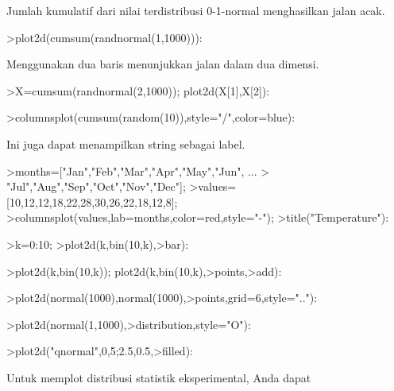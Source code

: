 \documentclass[a4paper,10pt]{article}
\begin{document}
\begin{eulernotebook}
\begin{eulercomment}
\begin{eulercomment}
\begin{eulercomment}
\begin{eulercomment}
\begin{eulercomment}
Jumlah kumulatif dari nilai terdistribusi 0-1-normal menghasilkan
jalan acak.
\end{eulercomment}
\begin{eulerprompt}
>plot2d(cumsum(randnormal(1,1000))):
\end{eulerprompt}
\begin{eulercomment}
Menggunakan dua baris menunjukkan jalan dalam dua dimensi.
\end{eulercomment}
\begin{eulerprompt}
>X=cumsum(randnormal(2,1000)); plot2d(X[1],X[2]):
\end{eulerprompt}
\begin{eulerprompt}
>columnsplot(cumsum(random(10)),style="/",color=blue):
\end{eulerprompt}
\begin{eulercomment}
Ini juga dapat menampilkan string sebagai label.
\end{eulercomment}
\begin{eulerprompt}
>months=["Jan","Feb","Mar","Apr","May","Jun", ...
>  "Jul","Aug","Sep","Oct","Nov","Dec"];
>values=[10,12,12,18,22,28,30,26,22,18,12,8];
>columnsplot(values,lab=months,color=red,style="-");
>title("Temperature"):
\end{eulerprompt}
\begin{eulerprompt}
>k=0:10;
>plot2d(k,bin(10,k),>bar):
\end{eulerprompt}
\begin{eulerprompt}
>plot2d(k,bin(10,k)); plot2d(k,bin(10,k),>points,>add):
\end{eulerprompt}
\begin{eulerprompt}
>plot2d(normal(1000),normal(1000),>points,grid=6,style=".."):
\end{eulerprompt}
\begin{eulerprompt}
>plot2d(normal(1,1000),>distribution,style="O"):
\end{eulerprompt}
\begin{eulerprompt}
>plot2d("qnormal",0,5;2.5,0.5,>filled):
\end{eulerprompt}
\begin{eulercomment}
Untuk memplot distribusi statistik eksperimental, Anda dapat

\end{eulercomment}
\end{eulercomment}
\end{eulercomment}
\end{eulercomment}
\end{eulercomment}
\end{eulernotebook}
\end{document}
